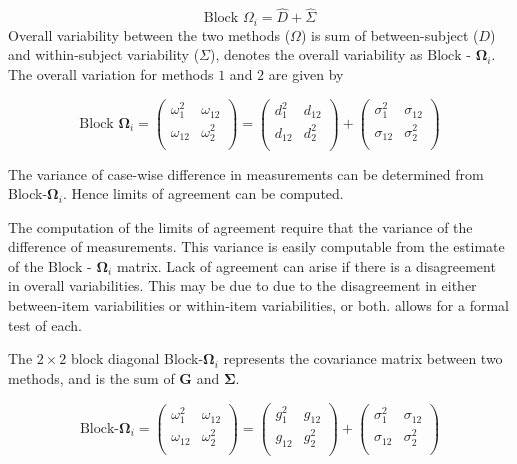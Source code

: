 \documentclass[12pt, a4paper]{report}
\theoremstyle{plain}
\theoremstyle{definition}
\theoremstyle{remark}
\begin{document}
	\begin{equation}
	\mbox{Block  }\Omega_{i} = \hat{D} + \hat{\Sigma}
	\end{equation}
	Overall variability between the two methods ($\Omega$) is sum of between-subject ($D$) and within-subject variability ($\Sigma$),
	\citet{ARoy2009} denotes the overall variability	as ${\mbox{Block - }\boldsymbol \Omega_{i}}$. The overall variation for methods $1$ and $2$ are given by
	
	\begin{center}
		\[\mbox{Block } \boldsymbol{\Omega}_i = \left(\begin{array}{cc}
		\omega^2_1  & \omega_{12} \\
		\omega_{12} & \omega^2_2 \\
		\end{array}  \right)
		=  \left(
		\begin{array}{cc}
		d^2_1  & d_{12} \\
		d_{12} & d^2_2 \\
		\end{array} \right)+
		\left(
		\begin{array}{cc}
		\sigma^2_1  & \sigma_{12} \\
		\sigma_{12} & \sigma^2_2 \\
		\end{array}\right)
		\]
	\end{center}
	
	The variance of case-wise difference in measurements can be determined from Block-$\boldsymbol{\Omega}_{i}$. Hence limits of agreement can be computed.
	
	The computation of the limits of agreement require that the variance of the difference of measurements. This variance is easily computable from the estimate of the ${\mbox{Block - }\boldsymbol \Omega_{i}}$ matrix. Lack of agreement can arise if there is a disagreement in overall variabilities. This may be due to due to the disagreement in either between-item
	variabilities or within-item variabilities, or both. \citet{ARoy2009} allows for a formal test of each.
	
	The $2 \times 2$ block diagonal Block-$\boldsymbol{\Omega}_{i}$ represents the covariance matrix between two methods, and is the sum of $\boldsymbol{G}$ and $\boldsymbol{\Sigma}$.
	
	\[ \textrm{Block-}\boldsymbol{\Omega}_{i}  = \left(\begin{array}{cc}
	\omega^2_1  & \omega_{12} \\
	\omega_{12} & \omega^2_2 \\
	\end{array}  \right)
	=  \left(
	\begin{array}{cc}
	g^2_1  & g_{12} \\
	g_{12} & g^2_2 \\
	\end{array} \right)+
	\left(
	\begin{array}{cc}
	\sigma^2_1  & \sigma_{12} \\
	\sigma_{12} & \sigma^2_2 \\
	\end{array}\right)
	\]
	
\end{document}
